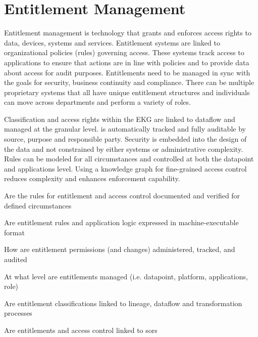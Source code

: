 \section{Entitlement Management}\label{sec:ekgmm-b-4-4} %

Entitlement management is technology that grants and enforces access rights to data, devices, systems and services.
Entitlement systems are linked to organizational policies (rules) governing access.
These systems track access to applications to ensure that actions are in line with policies and to provide data
about access for audit purposes.
Entitlements need to be managed in sync with the goals for security, business continuity and compliance.
There can be multiple proprietary systems that all have unique entitlement structures and
individuals can move across departments and perform a variety of roles.

\ekgmmContextSection

Classification and access rights within the EKG are linked to dataflow and managed at the granular level.
 is automatically tracked and fully auditable by source, purpose and responsible party.
Security is embedded into the design of the data and not constrained by either systems or administrative complexity.
Rules can be modeled for all circumstances and controlled at both the datapoint and applications level.
Using a knowledge graph for fine-grained access control reduces complexity and enhances enforcement capability.

\kgmmcorequestionssection

\begin{core-questions}

  \item [\thesection.1] Are the rules for entitlement and access control documented and verified for defined circumstances
  \item [\thesection.2] Are entitlement rules and application logic expressed in machine-executable format
  \item [\thesection.3] How are entitlement permissions (and changes) administered, tracked, and audited
  \item [\thesection.4] At what level are entitlements managed (i.e. datapoint, platform, applications, role)
  \item [\thesection.5] Are entitlement classifications linked to lineage, dataflow and transformation processes
  \item [\thesection.6] Are entitlements and access control linked to \glspl{sor}

\end{core-questions}


